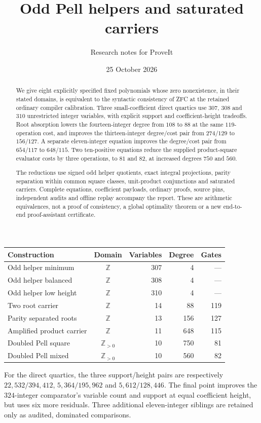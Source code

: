 \documentclass[11pt]{article}
\title{Odd Pell helpers and saturated carriers}
\author{Research notes for ProveIt}
\date{25 October 2026}
\begin{document}
\maketitle
\begin{abstract}
We give eight explicitly specified fixed polynomials whose zero nonexistence,
in their stated domains, is equivalent to the syntactic consistency of ZFC
at the retained ordinary compiler calibration. Three small-coefficient direct
quartics use $307$, $308$ and $310$ unrestricted integer variables, with explicit
support and coefficient-height tradeoffs. Root absorption lowers the fourteen-integer degree from $108$ to $88$
at the same $119$-operation cost, and improves the thirteen-integer
degree/cost pair from $274/129$ to $156/127$.
A separate eleven-integer equation improves the degree/cost pair from
$654/117$ to $648/115$. Two ten-positive equations reduce the supplied
product-square evaluator costs by three operations, to $81$ and $82$,
at increased degrees $750$ and $560$.

The reductions use signed odd helper quotients, exact integral projections,
parity separation within common square classes, unit-product conjunctions
and saturated carriers. Complete equations, coefficient payloads, ordinary
proofs, source pins, independent audits and offline replay accompany the
report. These are arithmetic equivalences, not a proof of consistency,
a global optimality theorem or a new end-to-end proof-assistant certificate.
\end{abstract}
\begin{center}\small
\begin{tabular}{lcrrr}
\toprule
Construction & Domain & Variables & Degree & Gates\\
\midrule
Odd helper minimum & $\mathbb Z$ & 307 & 4 & ---\\
Odd helper balanced & $\mathbb Z$ & 308 & 4 & ---\\
Odd helper low height & $\mathbb Z$ & 310 & 4 & ---\\
Two root carrier & $\mathbb Z$ & 14 & 88 & 119\\
Parity separated roots & $\mathbb Z$ & 13 & 156 & 127\\
Amplified product carrier & $\mathbb Z$ & 11 & 648 & 115\\
Doubled Pell square & $\mathbb Z_{>0}$ & 10 & 750 & 81\\
Doubled Pell mixed & $\mathbb Z_{>0}$ & 10 & 560 & 82\\
\bottomrule
\end{tabular}
\end{center}
For the direct quartics, the three support/height pairs are respectively
$22,532/394,412$, $5,364/195,962$ and $5,612/128,446$.
The final point improves the $324$-integer comparator's variable count and
support at equal coefficient height, but uses six more residuals.
Three additional eleven-integer siblings are retained only as audited,
dominated comparisons.
\clearpage
\tableofcontents
\clearpage
\end{document}
